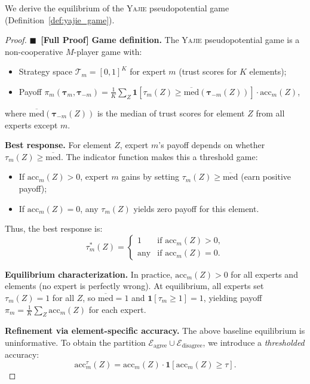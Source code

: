 \documentclass[11pt,a4paper]{article}
\theoremstyle{definition}
\newcommand{\rigorFull}[0]{$\blacksquare$~\textbf{[Full Proof]}}
\newcommand{\Yajie}{\textsc{Yajie}}
\newcommand{\ind}[1]{\mathbf{1}[#1]}
\begin{document}
We derive the equilibrium of the \Yajie{} pseudopotential game (Definition~\ref{def:yajie_game}).

\begin{proof}\rigorFull
\textbf{Game definition.} The \Yajie{} pseudopotential game is a non-cooperative $M$-player game with:
\begin{itemize}
    \item Strategy space $\mathcal{T}_m = [0,1]^K$ for expert $m$ (trust scores for $K$ elements);
    \item Payoff $\pi_m(\boldsymbol{\tau}_m, \boldsymbol{\tau}_{-m}) = \frac{1}{K}\sum_{Z} \ind{\tau_m(Z) \geq \overline{\mathrm{med}}(\boldsymbol{\tau}_{-m}(Z))} \cdot \mathrm{acc}_m(Z)$,
\end{itemize}
where $\overline{\mathrm{med}}(\boldsymbol{\tau}_{-m}(Z))$ is the median of trust scores for element $Z$ from all experts except $m$.

\textbf{Best response.} For element $Z$, expert $m$'s payoff depends on whether $\tau_m(Z) \geq \overline{\mathrm{med}}$. The indicator function makes this a threshold game:
\begin{itemize}
    \item If $\mathrm{acc}_m(Z) > 0$, expert $m$ gains by setting $\tau_m(Z) \geq \overline{\mathrm{med}}$ (earn positive payoff);
    \item If $\mathrm{acc}_m(Z) = 0$, any $\tau_m(Z)$ yields zero payoff for this element.
\end{itemize}

Thus, the best response is:
\begin{equation}
\tau_m^*(Z) = \begin{cases}
1 & \text{if } \mathrm{acc}_m(Z) > 0,\\
\text{any} & \text{if } \mathrm{acc}_m(Z) = 0.
\end{cases}
\end{equation}

\textbf{Equilibrium characterization.} In practice, $\mathrm{acc}_m(Z) > 0$ for all experts and elements (no expert is perfectly wrong). At equilibrium, all experts set $\tau_m(Z) = 1$ for all $Z$, so $\overline{\mathrm{med}} = 1$ and $\ind{\tau_m \geq 1} = 1$, yielding payoff $\pi_m = \frac{1}{K}\sum_Z \mathrm{acc}_m(Z)$ for each expert.

\textbf{Refinement via element-specific accuracy.} The above baseline equilibrium is uninformative. To obtain the partition $\mathcal{E}_{\mathrm{agree}} \cup \mathcal{E}_{\mathrm{disagree}}$, we introduce a \textit{thresholded} accuracy:
\begin{equation}
\mathrm{acc}_m^\tau(Z) = \mathrm{acc}_m(Z) \cdot \ind{\mathrm{acc}_m(Z) \geq \tau}.
\end{equation}


\end{proof}
\end{document}

